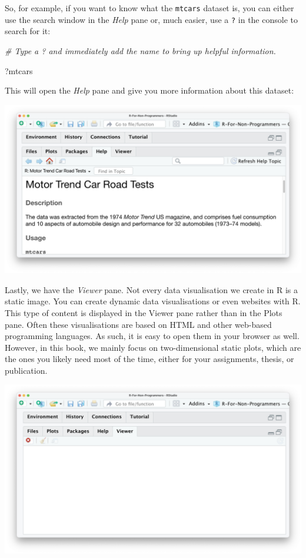 \documentclass[
]{book}
\newenvironment{Shaded}{\begin{snugshade}}{\end{snugshade}}
\newcommand{\CommentTok}[1]{\textcolor[rgb]{0.56,0.35,0.01}{\textit{#1}}}
\newcommand{\NormalTok}[1]{#1}
\begin{document}
So, for example, if you want to know what the \texttt{mtcars} dataset is, you can either use the search window in the \emph{Help} pane or, much easier, use a \texttt{?} in the console to search for it:

\begin{Shaded}
\begin{Highlighting}[]
\CommentTok{\# Type a \textquotesingle{}?\textquotesingle{} and immediately add the name to bring up helpful information.}

\NormalTok{?mtcars}
\end{Highlighting}
\end{Shaded}

This will open the \emph{Help} pane and give you more information about this dataset:

\includegraphics{images/chapter_04_img/05_files_plots_etc/04_rstudio_help_mtcars.png}

Lastly, we have the \emph{Viewer} pane. Not every data visualisation we create in R is a static image. You can create dynamic data visualisations or even websites with R. This type of content is displayed in the Viewer pane rather than in the Plots pane. Often these visualisations are based on HTML and other web-based programming languages. As such, it is easy to open them in your browser as well. However, in this book, we mainly focus on two-dimensional static plots, which are the ones you likely need most of the time, either for your assignments, thesis, or publication.

\includegraphics{images/chapter_04_img/05_files_plots_etc/05_rstudio_viewer.png}
\end{document}
